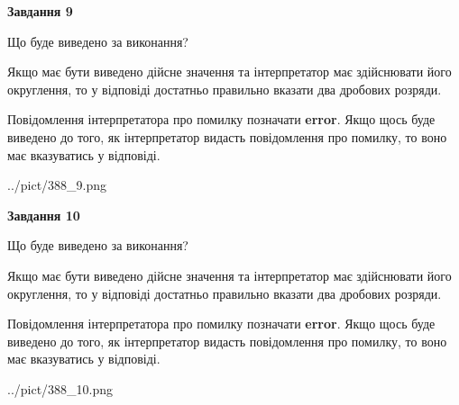 \documentclass[12pt, ukrainian]{article}
\begin{document}
{\begin {Large}
{\begin {center}\textbf{Завдання 9}\end {center}}\par
Що буде виведено за виконання? \par

Якщо має бути виведено дійсне значення та інтерпретатор має здійснювати його округлення, 
то у відповіді достатньо правильно вказати два дробових розряди.

Повідомлення інтерпретатора про помилку позначати \textbf{error}.
Якщо щось буде виведено до того, як інтерпретатор видасть повідомлення про помилку, 
то воно має вказуватись у відповіді. \par

\begin{center}
	{../pict/388_9.png}
\end{center}
\newpage

{\begin {center}\textbf{Завдання 10}\end {center}}\par
Що буде виведено за виконання? \par

Якщо має бути виведено дійсне значення та інтерпретатор має здійснювати його округлення, 
то у відповіді достатньо правильно вказати два дробових розряди.

Повідомлення інтерпретатора про помилку позначати \textbf{error}.
Якщо щось буде виведено до того, як інтерпретатор видасть повідомлення про помилку, 
то воно має вказуватись у відповіді. \par

\begin{center}
	{../pict/388_10.png}
\end{center}
\newpage

\end {Large}}
\end{document}
